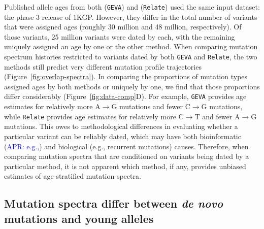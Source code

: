 \documentclass[]{article}
\newcommand{\aprcomment}[1]{{\textcolor{blue}{APR: #1}}}
\newcommand{\GEVA}{\texttt{GEVA}\xspace}
\newcommand{\relate}{\texttt{Relate}\xspace}
\begin{document}
Published allele ages from both \citet{albers2020dating} (\GEVA) and
\citet{speidel2019method} (\relate) used the same input dataset: the phase 3
release of 1KGP. However, they differ in the total number of variants that were
assigned ages (roughly 30 million and 48 million, respectively). Of those
variants, 25 million variants were dated by each, with the remaining uniquely
assigned an age by one or the other method. When comparing mutation spectrum
histories restricted to variants dated by both \GEVA and \relate, the two
methods still predict very different mutation profile trajectories
(Figure~\ref{fig:overlap-spectra}). In comparing the proportions of mutation
types assigned ages by both methods or uniquely by one, we find that those
proportions differ considerably (Figure~\ref{fig:data-comp}D). For example,
\GEVA provides age estimates for relatively more A$\rightarrow$G mutations and
fewer C$\rightarrow$G mutations, while \relate provides age estimates for
relatively more C$\rightarrow$T and fewer A$\rightarrow$G mutations. This owes
to methodological differences in evaluating whether a particular variant can be
reliably dated, which may have both bioinformatic (\aprcomment{e.g.,}) and
biological (e.g., recurrent mutations) causes.  Therefore, when comparing
mutation spectra that are conditioned on variants being dated by a particular
method, it is not apparent which method, if any, provides unbiased estimates
of age-stratified mutation spectra.

\subsection*{Mutation spectra differ between \emph{de novo} mutations and young
alleles}
\end{document}
